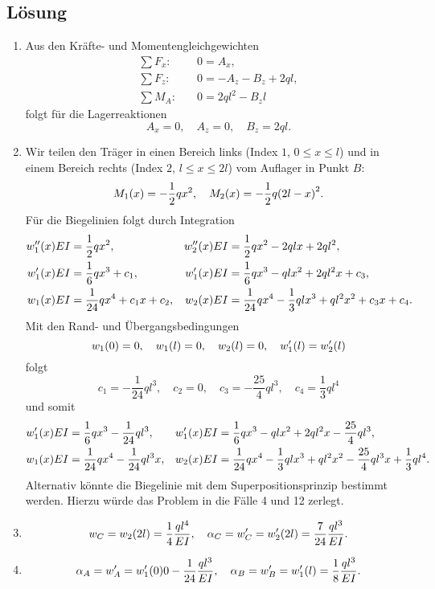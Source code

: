 \documentclass{exercise}
\begin{document}
    \subsection*{Lösung}
    \begin{enumerate}
        \item Aus den Kräfte- und Momentengleichgewichten
        \begin{align*}
            \sum F_x: &\quad 0 = A_x,\\
            \sum F_z: &\quad 0 = -A_z - B_z + 2ql,\\
            \sum M_A: &\quad 0 = 2ql^2 - B_z l
        \end{align*}
        folgt für die Lagerreaktionen
        \[
            A_x = 0, \quad A_z = 0, \quad B_z = 2ql.
        \]
        \item Wir teilen den Träger in einen Bereich links (Index \(1\), \(0 \le x \le l\)) und in einem Bereich rechts (Index \(2\), \(l \le x \le 2l\)) vom Auflager in Punkt \(B\):
        \[
            M_1\parentheses*{x} = -\frac{1}{2}qx^2, \quad M_2\parentheses*{x} = -\frac{1}{2}q\parentheses*{2l - x}^2.
        \]
        Für die Biegelinien folgt durch Integration
        \begin{align*}
            w_1''\parentheses*{x}EI &= \frac{1}{2}qx^2, & w_2''\parentheses*{x}EI &= \frac{1}{2}qx^2 - 2qlx + 2ql^2,\\
            w_1'\parentheses*{x}EI &= \frac{1}{6}qx^3 + c_1, & w_1'\parentheses*{x}EI &= \frac{1}{6}qx^3 - qlx^2 + 2ql^2 x + c_3,\\
            w_1\parentheses*{x}EI &= \frac{1}{24}qx^4 + c_1 x + c_2, & w_2\parentheses*{x}EI &= \frac{1}{24}qx^4 - \frac{1}{3}qlx^3 + ql^2 x^2 + c_3 x + c_4.
        \end{align*}
        Mit den Rand- und Übergangsbedingungen
        \[
            w_1\parentheses*{0} = 0, \quad w_1\parentheses*{l} = 0, \quad w_2\parentheses*{l} = 0, \quad w_1'\parentheses*{l} = w_2'\parentheses*{l}
        \]
        folgt
        \[
            c_1 = -\frac{1}{24}ql^3, \quad c_2 = 0, \quad c_3 = -\frac{25}{4}ql^3, \quad c_4 = \frac{1}{3}ql^4
        \]
        und somit
        \begin{align*}
            w_1'\parentheses*{x}EI &= \frac{1}{6}qx^3 - \frac{1}{24}ql^3, & w_1'\parentheses*{x}EI &= \frac{1}{6}qx^3 - qlx^2 + 2ql^2 x - \frac{25}{4}ql^3,\\
            w_1\parentheses*{x}EI &= \frac{1}{24}qx^4 - \frac{1}{24}ql^3 x, & w_2\parentheses*{x}EI &= \frac{1}{24}qx^4 - \frac{1}{3}qlx^3 + ql^2 x^2 - \frac{25}{4}ql^3 x + \frac{1}{3}ql^4.
        \end{align*}
        Alternativ könnte die Biegelinie mit dem Superpositionsprinzip bestimmt werden.
        Hierzu würde das Problem in die Fälle 4 und 12 zerlegt.
        \item
        \[
            w_C = w_2\parentheses*{2l} = \frac{1}{4}\frac{ql^4}{EI}, \quad \alpha_C = w_C' = w_2'\parentheses*{2l} = \frac{7}{24}\frac{ql^3}{EI}.
        \]
        \item
        \[
            \alpha_A = w_A' = w_1'\parentheses*{0} 0 -\frac{1}{24}\frac{ql^3}{EI}, \quad \alpha_B = w_B' = w_1'\parentheses*{l} = \frac{1}{8}\frac{ql^3}{EI}.
        \]
    \end{enumerate}
\end{document}
